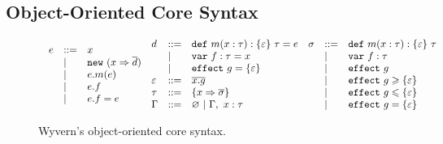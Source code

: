 \subsection{Object-Oriented Core Syntax}

\begin{figure}[htb]
\footnotesize{
\[
\begin{array}{lll}
\begin{array}{lllr}
e & ::= & x \\
& | & \mathtt{new}~(x \Rightarrow \overline{d}) \\
& | & e.m(e)\\
& | & e.f \\
& | & e.f = e 
\end{array}
\begin{array}{lllr}
d & ::= & \mathtt{def}~ m(x : \tau) : \{ \varepsilon \}~\tau = e \\
  & |   & \mathtt{var}~ f : \tau = x\\
& |   & \mathtt{effect}~ g = \{ \varepsilon \} \\
\varepsilon & ::= & \overline{x.g} \\
\tau & ::= & \{ x \Rightarrow \overline{\sigma} \} \\
\Gamma & :: = & \varnothing~|~\Gamma,~x : \tau 
\end{array}
\begin{array}{lllr}
\sigma & ::= & \mathtt{def}~ m(x : \tau) : \{ \varepsilon \}~\tau \\
       & |   & \mathtt{var}~ f: \tau\\
       & |   & \mathtt{effect}~ g \\
       & |   & \mathtt{effect}~ g \geqslant \{ \varepsilon \} \\
       & |   & \mathtt{effect}~ g \leqslant \{ \varepsilon \} \\
       & |   & \mathtt{effect}~ g = \{ \varepsilon \} 
\end{array}
\end{array}
\]
}
\caption{Wyvern's object-oriented core syntax.}
\label{f-syntax}
\end{figure}




